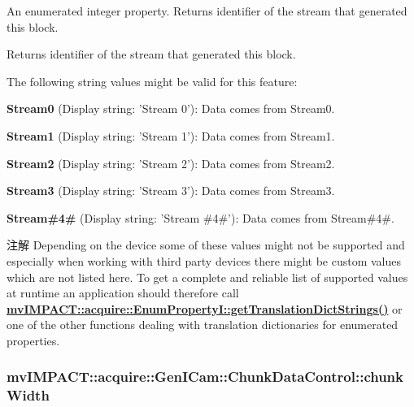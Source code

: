 An enumerated integer property. Returns identifier of the stream that generated this block. 

Returns identifier of the stream that generated this block.

The following string values might be valid for this feature\+:
\begin{DoxyItemize}
\item {\bfseries Stream0} (Display string\+: 'Stream 0')\+: Data comes from Stream0.
\item {\bfseries Stream1} (Display string\+: 'Stream 1')\+: Data comes from Stream1.
\item {\bfseries Stream2} (Display string\+: 'Stream 2')\+: Data comes from Stream2.
\item {\bfseries Stream3} (Display string\+: 'Stream 3')\+: Data comes from Stream3.
\item {\bfseries Stream\#4\#} (Display string\+: 'Stream \#4\#')\+: Data comes from Stream\#4\#.
\end{DoxyItemize}

\begin{DoxyNote}{注解}
Depending on the device some of these values might not be supported and especially when working with third party devices there might be custom values which are not listed here. To get a complete and reliable list of supported values at runtime an application should therefore call {\bfseries \hyperlink{classmv_i_m_p_a_c_t_1_1acquire_1_1_enum_property_i_a0ba6ccbf5ee69784d5d0b537924d26b6}{mv\+I\+M\+P\+A\+C\+T\+::acquire\+::\+Enum\+Property\+I\+::get\+Translation\+Dict\+Strings()}} or one of the other functions dealing with translation dictionaries for enumerated properties. 
\end{DoxyNote}
\hypertarget{classmv_i_m_p_a_c_t_1_1acquire_1_1_gen_i_cam_1_1_chunk_data_control_a6cf6b5feed11d6d46885ee126a7345f4}{
\subsubsection[{chunk\+Width}]{ mv\+I\+M\+P\+A\+C\+T\+::acquire\+::\+Gen\+I\+Cam\+::\+Chunk\+Data\+Control\+::chunk\+Width}}\label{classmv_i_m_p_a_c_t_1_1acquire_1_1_gen_i_cam_1_1_chunk_data_control_a6cf6b5feed11d6d46885ee126a7345f4}


